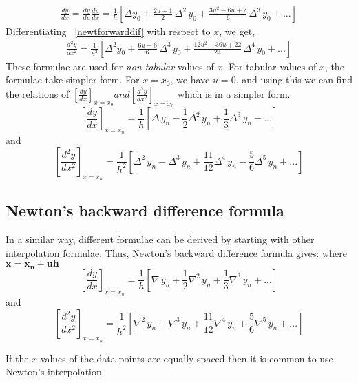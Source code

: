 \documentclass[aima203_lecturenotes_ku.tex]{subfiles}
\begin{document}
\begin{equation}
  \label{newtforwarddif}
  \begin{aligned}
    \frac{dy}{dx} =\frac{dy}{du} \frac{du}{dx} = \frac{1}{h} \left [ \Delta y_0 + \frac{2u -1}{2}\, \Delta^2\,  y_0 + \frac{3u^2-6u + 2}{6}\, \Delta^3 \, y_0 + ... \right ]
  \end{aligned}
\end{equation}
Differentiating ~\ref{newtforwarddif} with respect to $x$, we get,
\begin{equation}
  \label{newtforwarddif2}
  \begin{aligned}
    \frac{d^2y}{dx^2} = \frac{1}{h^2} \left [ \Delta^2 y_0 + \frac{6u -6}{6}\, \Delta^3 \,  y_0 + \frac{12u^2-36u + 22}{24}\, \Delta^4 \, y_0 + ... \right ]
  \end{aligned}
\end{equation}
These formulae are used for \textit{non-tabular} values of $x$. For tabular values of $x$, the formulae take simpler form. For $x=x_0$, we have $u=0$, and using this we can find the relations of $\displaystyle \left [ \frac{dy}{dx} \right ]  _{x=x_0} and \left [\frac{d^2y}{dx^2} \right ] _{x=x_0}$ which is in a simpler form.
\newpage
\begin{equation}
  \label{newtforw1x}
  \left [ \frac{dy}{dx} \right ] _{x=x_n} = \frac{1}{h} \left [\Delta \, y_n - \frac{1}{2} \Delta ^2 \, y_n + \frac{1}{3} \Delta ^3 \, y_n - ... \right ]
\end{equation}
and
\begin{equation}
  \label{newtforw2x}
  \left [ \frac{d^2y}{dx^2} \right ] _{x=x_n} = \frac{1}{h^2} \left [\Delta^2 \, y_n - \Delta ^3 \, y_n + \frac{11}{12} \Delta ^4 \, y_n - \frac{5}{6} \Delta ^5 \, y_n + ... \right ]
\end{equation}

\subsection{Newton's backward difference formula}
In a similar way, different formulae can be derived by starting with other interpolation formulae. Thus, Newton's backward difference formula gives: where $\mathbf{x = x_n + uh}$
\begin{equation}
  \label{newtbackwarddif}
  \left [ \frac{dy}{dx} \right ] _{x=x_n} = \frac{1}{h} \left [\nabla \, y_n + \frac{1}{2} \nabla ^2 \, y_n + \frac{1}{3} \nabla ^3 \, y_n + ... \right ]
\end{equation}
and
\begin{equation}
  \label{newtbackwarddif2}
  \left [ \frac{d^2y}{dx^2} \right ] _{x=x_n} = \frac{1}{h^2} \left [\nabla^2 \, y_n + \nabla ^3 \, y_n + \frac{11}{12} \nabla ^4 \, y_n + \frac{5}{6} \nabla ^5 \, y_n + ... \right ]
\end{equation}
\begin{remark}
   If the $x$-values of the data points are equally spaced then it is common to use Newton's interpolation.
\end{remark}
\end{document}
